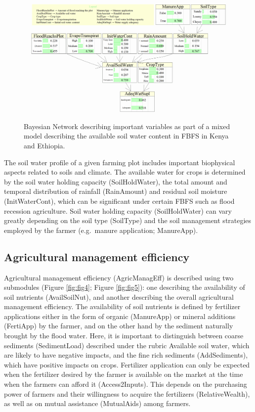 \documentclass[]{elsarticle} %
\begin{document}
\begin{figure}[!h]

{\centering \includegraphics[width=1\linewidth,]{figures/Modelling_FBFS_Suppl_Water_Supply_Adequacy_BNs_plot} 

}

\caption{Bayesian Network describing important variables as part of a mixed model describing the available soil water content in FBFS in Kenya and Ethiopia.}\label{fig:fig3}
\end{figure}

The soil water profile of a given farming plot includes important biophysical aspects related to soils and climate. The available water for crops is determined by the soil water holding capacity (SoilHoldWater), the total amount and temporal distribution of rainfall (RainAmount) and residual soil moisture (InitWaterCont), which can be significant under certain FBFS such as flood recession agriculture. Soil water holding capacity (SoilHoldWater) can vary greatly depending on the soil type (SoilType) and the soil management strategies employed by the farmer (e.g.~manure application; ManureApp).

\hypertarget{refs13}{%
\subsection{Agricultural management efficiency}\label{refs13}}

Agricultural management efficiency (AgricManagEff) is described using two submodules (Figure \ref{fig:fig4}; Figure \ref{fig:fig5}): one describing the availability of soil nutrients (AvailSoilNut), and another describing the overall agricultural management efficiency. The availability of soil nutrients is defined by fertilizer applications either in the form of organic (ManureApp) or mineral additions (FertiApp) by the farmer, and on the other hand by the sediment naturally brought by the flood water. Here, it is important to distinguish between coarse sediments (SedimentLoad) described under the rubric Available soil water, which are likely to have negative impacts, and the fine rich sediments (AddSediments), which have positive impacts on crops. Fertilizer application can only be expected when the fertilizer desired by the farmer is available on the market at the time when the farmers can afford it (Access2Inputs). This depends on the purchasing power of farmers and their willingness to acquire the fertilizers (RelativeWealth), as well as on mutual assistance (MutualAids) among farmers.
\end{document}
